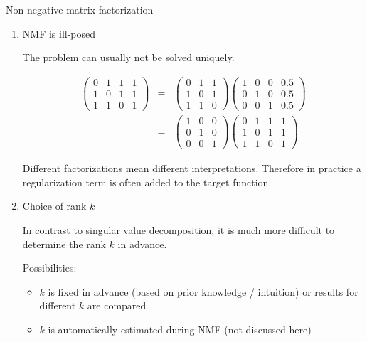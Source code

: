 \documentclass[11pt,compress,t,notes=noshow, xcolor=table]{beamer}
\begin{document}
\begin{vbframe}{Non-negative matrix factorization}
\begin{enumerate}
\item NMF is ill-posed \\

\lz

The problem can usually not be solved uniquely.

\begin{eqnarray*}
\begin{pmatrix} 0 & 1 & 1 & 1 \\
1 & 0 & 1 & 1 \\
1 & 1 & 0 & 1 \end{pmatrix} &=& \begin{pmatrix} 0 & 1 & 1  \\
1 & 0 & 1 \\
1 & 1 & 0 \end{pmatrix} \begin{pmatrix} 1 & 0 & 0 & 0.5 \\
0 & 1 & 0 & 0.5 \\
0 & 0 & 1 & 0.5 \end{pmatrix} \\ &=&
\begin{pmatrix} 1 & 0 & 0  \\
0 & 1 & 0 \\
0 & 0 & 1 \end{pmatrix} \begin{pmatrix} 0 & 1 & 1 & 1 \\
1 & 0 & 1 & 1 \\
1 & 1 & 0 & 1 \end{pmatrix}
\end{eqnarray*}

Different factorizations mean different interpretations. Therefore in practice a regularization term is often added to the target function.

\framebreak

\item Choice of rank $k$

\lz

In contrast to singular value decomposition, it is much more difficult to determine the rank $k$ in advance.

\lz

Possibilities:

\begin{itemize}
\item $k$ is fixed in advance (based on prior knowledge / intuition) or results for different $k$ are compared
\item $k$ is automatically estimated during NMF (not discussed here)
\end{itemize}

\end{enumerate}

\end{vbframe}
\end{document}
